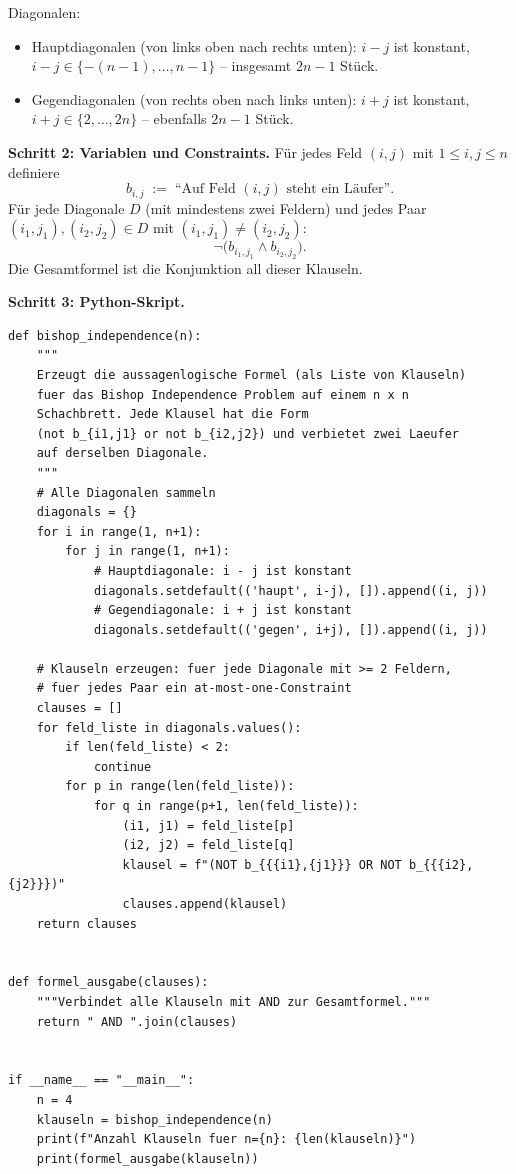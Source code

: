 \documentclass[a4paper,12pt]{article}
\begin{document}
Diagonalen:
\begin{itemize}[nosep]
\item Hauptdiagonalen (von links oben nach rechts unten): $i - j$
      ist konstant, $i - j \in \{-(n-1), \ldots, n-1\}$ --
      insgesamt $2n - 1$ St\"uck.
\item Gegendiagonalen (von rechts oben nach links unten): $i + j$
      ist konstant, $i + j \in \{2, \ldots, 2n\}$ -- ebenfalls
      $2n - 1$ St\"uck.
\end{itemize}

\medskip
\textbf{Schritt 2: Variablen und Constraints.}
F\"ur jedes Feld $(i,j)$ mit $1 \le i,j \le n$ definiere
\[
b_{i,j} \;:=\; \text{``Auf Feld $(i,j)$ steht ein L\"aufer''}.
\]
F\"ur jede Diagonale $D$ (mit mindestens zwei Feldern) und jedes
Paar $(i_1,j_1), (i_2,j_2) \in D$ mit $(i_1,j_1) \neq (i_2,j_2)$:
\[
\neg\bigl(b_{i_1,j_1} \wedge b_{i_2,j_2}\bigr).
\]
Die Gesamtformel ist die Konjunktion all dieser Klauseln.

\medskip
\textbf{Schritt 3: Python-Skript.}

\begin{lstlisting}
def bishop_independence(n):
    """
    Erzeugt die aussagenlogische Formel (als Liste von Klauseln)
    fuer das Bishop Independence Problem auf einem n x n
    Schachbrett. Jede Klausel hat die Form
    (not b_{i1,j1} or not b_{i2,j2}) und verbietet zwei Laeufer
    auf derselben Diagonale.
    """
    # Alle Diagonalen sammeln
    diagonals = {}
    for i in range(1, n+1):
        for j in range(1, n+1):
            # Hauptdiagonale: i - j ist konstant
            diagonals.setdefault(('haupt', i-j), []).append((i, j))
            # Gegendiagonale: i + j ist konstant
            diagonals.setdefault(('gegen', i+j), []).append((i, j))

    # Klauseln erzeugen: fuer jede Diagonale mit >= 2 Feldern,
    # fuer jedes Paar ein at-most-one-Constraint
    clauses = []
    for feld_liste in diagonals.values():
        if len(feld_liste) < 2:
            continue
        for p in range(len(feld_liste)):
            for q in range(p+1, len(feld_liste)):
                (i1, j1) = feld_liste[p]
                (i2, j2) = feld_liste[q]
                klausel = f"(NOT b_{{{i1},{j1}}} OR NOT b_{{{i2},{j2}}})"
                clauses.append(klausel)
    return clauses


def formel_ausgabe(clauses):
    """Verbindet alle Klauseln mit AND zur Gesamtformel."""
    return " AND ".join(clauses)


if __name__ == "__main__":
    n = 4
    klauseln = bishop_independence(n)
    print(f"Anzahl Klauseln fuer n={n}: {len(klauseln)}")
    print(formel_ausgabe(klauseln))
\end{lstlisting}
\end{document}
